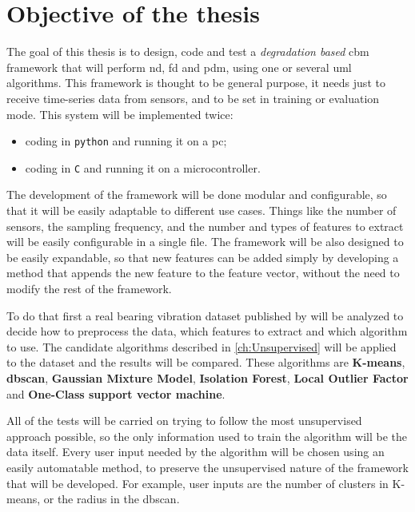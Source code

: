 \section{Objective of the thesis}
\label{sec:objectives}

The goal of this thesis is to design, code and test a \emph{degradation based} \gls{cbm} framework that will perform \gls{nd}, \gls{fd} and \gls{pdm}, using one or several \gls{uml} algorithms. This framework is thought to be general purpose, it needs just to receive time-series data from sensors, and to be set in training or evaluation mode.
This system will be implemented twice:
\begin{itemize}
    \item  coding in \texttt{python} and running it on a \gls{pc};
    \item   coding in \texttt{C} and running it on a microcontroller.
\end{itemize}

The development of the framework will be done modular and configurable, so that it will be easily adaptable to different use cases. Things like the number of sensors, the sampling frequency, and the number and types of features to extract will be easily configurable in a single file. The framework will be also designed to be easily expandable, so that new features can be added simply by developing a method that appends the new feature to the feature vector, without the need to modify the rest of the framework.

To do that first a real bearing vibration dataset published by \cite{IMSpaper} will be analyzed to decide how to preprocess the data, which features to extract and which algorithm to use. 
The candidate algorithms described in \autoref{ch:Unsupervised} will be applied to the dataset and the results will be compared. These algorithms are \textbf{K-means}, \textbf{\gls{dbscan}}, \textbf{Gaussian Mixture Model}, \textbf{Isolation Forest}, \textbf{Local Outlier Factor} and \textbf{One-Class support vector machine}. 

All of the tests will be carried on trying to follow the most unsupervised approach possible, so the only information used to train the algorithm will be the data itself. Every user input needed by the algorithm will be chosen using an easily automatable method, to preserve the unsupervised nature of the framework that will be developed. For example, user inputs are the number of clusters in K-means, or the radius in the \gls{dbscan}.

